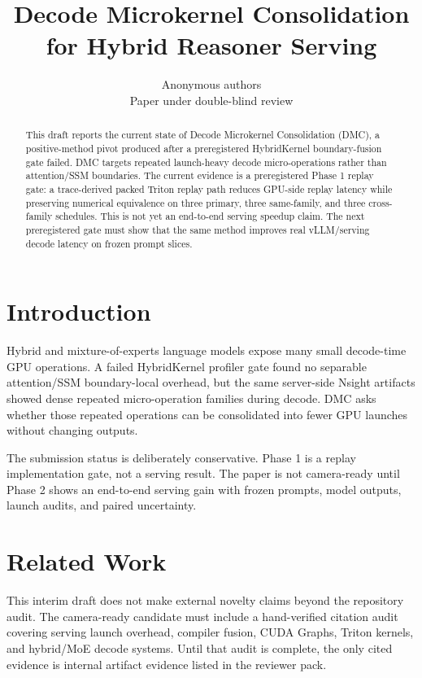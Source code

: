 \documentclass{article}
\title{Decode Microkernel Consolidation for Hybrid Reasoner Serving}
\author{Anonymous authors\\Paper under double-blind review}
\begin{document}
\maketitle

\begin{abstract}
This draft reports the current state of Decode Microkernel Consolidation
(DMC), a positive-method pivot produced after a preregistered HybridKernel
boundary-fusion gate failed. DMC targets repeated launch-heavy decode
micro-operations rather than attention/SSM boundaries. The current evidence is
a preregistered Phase 1 replay gate: a trace-derived packed Triton replay path
reduces GPU-side replay latency while preserving numerical equivalence on
three primary, three same-family, and three cross-family schedules. This is not
yet an end-to-end serving speedup claim. The next preregistered gate must show
that the same method improves real vLLM/serving decode latency on frozen
prompt slices.
\end{abstract}

\section{Introduction}

Hybrid and mixture-of-experts language models expose many small decode-time GPU
operations. A failed HybridKernel profiler gate found no separable
attention/SSM boundary-local overhead, but the same server-side Nsight
artifacts showed dense repeated micro-operation families during decode. DMC
asks whether those repeated operations can be consolidated into fewer GPU
launches without changing outputs.

The submission status is deliberately conservative. Phase 1 is a replay
implementation gate, not a serving result. The paper is not camera-ready until
Phase 2 shows an end-to-end serving gain with frozen prompts, model outputs,
launch audits, and paired uncertainty.

\section{Related Work}

This interim draft does not make external novelty claims beyond the repository
audit. The camera-ready candidate must include a hand-verified citation audit
covering serving launch overhead, compiler fusion, CUDA Graphs, Triton kernels,
and hybrid/MoE decode systems. Until that audit is complete, the only cited
evidence is internal artifact evidence listed in the reviewer pack.
\end{document}
